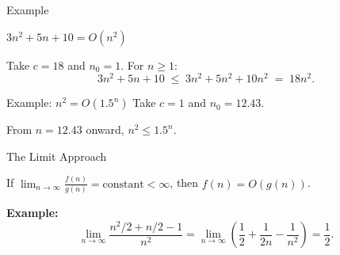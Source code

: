 \documentclass[10pt,aspectratio=169]{beamer}
\begin{document}
\begin{frame}{Example}
  \begin{center}
    $3n^2 + 5n + 10 = O(n^2)$
  \end{center}

  \bigskip
  Take $c = 18$ and $n_0 = 1$. For $n \ge 1$:
  \[
    3n^2 + 5n + 10 \;\le\; 3n^2 + 5n^2 + 10n^2 \;=\; 18n^2.
  \]


\end{frame}

\begin{frame}{Example: $n^2 = O(1.5^n)$}
  Take $c = 1$ and $n_0 = 12.43$.

  \begin{center}
  \end{center}
  \pause 
  \begin{center}
    From $n = 12.43$ onward, $n^2 \le 1.5^n$.
  \end{center}
\end{frame}

\begin{frame}{The Limit Approach}
  \begin{block}{}
    If $\displaystyle \lim_{n \to \infty} \frac{f(n)}{g(n)} = \text{constant} < \infty$, then $f(n) = O(g(n))$.
  \end{block}

  \bigskip
  \textbf{Example:}
  \[
    \lim_{n \to \infty} \frac{n^2/2 + n/2 - 1}{n^2}
    = \lim_{n \to \infty}\left(\frac{1}{2} + \frac{1}{2n} - \frac{1}{n^2}\right)
    = \frac{1}{2}.
  \]
\end{frame}
\end{document}

